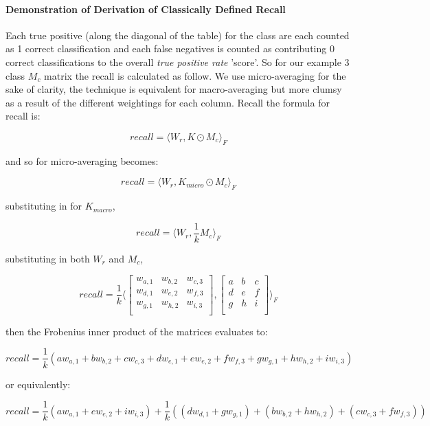 \documentclass[]{article}
\begin{document}
\paragraph{Demonstration of Derivation of Classically Defined Recall}

Each true positive (along the diagonal of the table) for the class are each counted as 1 correct classification and each false negatives is counted as contributing 0 correct classifications to the overall \textit{true positive rate} 'score'. So for our example 3 class $M_c$ matrix the recall is calculated as follow. We use micro-averaging for the sake of clarity, the technique is equivalent for macro-averaging but more clumsy as a result of the different weightings for each column. Recall the formula for recall is:

\[\textit{recall} = \langle W_r, K \odot M_c \rangle_F\]

\noindent and so for micro-averaging becomes:

\[\textit{recall} = \langle W_r, K_{micro} \odot M_c \rangle_F\]

\noindent substituting in for $K_{macro}$,

\[\textit{recall} = \langle W_r, \frac{1}{k}M_c \rangle_F\]

\noindent substituting in both $W_r$ and $M_c$,

\[\textit{recall} = \frac{1}{k}\langle \begin{bmatrix}
w_{a,1} & w_{b,2} & w_{c,3}\\
w_{d,1} & w_{e,2} & w_{f,3} \\
w_{g,1} & w_{h,2} & w_{i,3} \\
\end{bmatrix}, \begin{bmatrix}
a & b & c \\
d & e & f \\
g & h & i \\
\end{bmatrix} \rangle_F\]

\noindent then the Frobenius inner product of the matrices evaluates to:

\[\textit{recall} = \frac{1}{k}(aw_{a,1} + bw_{b,2} + cw_{c,3} + dw_{e,1} + ew_{e,2} + fw_{f,3} + gw_{g,1} + hw_{h,2} + iw_{i,3})\]

\noindent or equivalently:

\begin{equation} \label{eq:recallPosNeg}
\textit{recall} = \frac{1}{k}(aw_{a,1} + ew_{e,2} + iw_{i,3}) + \frac{1}{k}((dw_{d,1} + gw_{g,1}) + (bw_{b,2} + hw_{h,2}) + (cw_{c,3} +  fw_{f,3}))
\end{equation}
\end{document}

